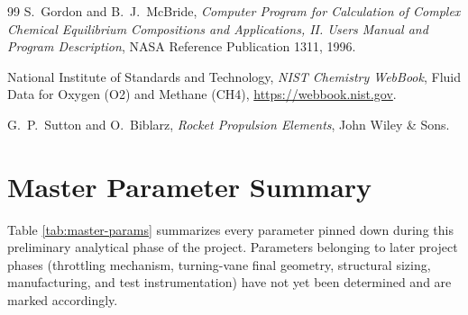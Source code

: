 \documentclass[11pt,a4paper]{article}
\begin{document}
\begin{thebibliography}{99}
 S.~Gordon and B.~J.~McBride, \emph{Computer Program for Calculation of Complex Chemical Equilibrium Compositions and Applications, II. Users Manual and Program Description}, NASA Reference Publication 1311, 1996.

 National Institute of Standards and Technology, \emph{NIST Chemistry WebBook}, Fluid Data for Oxygen (O2) and Methane (CH4), \url{https://webbook.nist.gov}.

 G.~P.~Sutton and O.~Biblarz, \emph{Rocket Propulsion Elements}, John Wiley \& Sons.

\end{thebibliography}

\clearpage
\appendix
\section{Master Parameter Summary}

Table \ref{tab:master-params} summarizes every parameter pinned down during this preliminary analytical phase of the project. Parameters belonging to later project phases (throttling mechanism, turning-vane final geometry, structural sizing, manufacturing, and test instrumentation) have not yet been determined and are marked accordingly.
\end{document}
